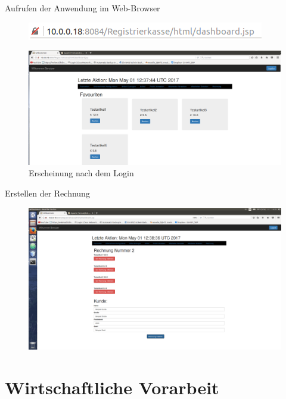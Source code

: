 \documentclass[12pt]{beamer}
\begin{document}
\begin{frame}
	Aufrufen der Anwendung im Web-Browser
	
	\begin{figure}
		\includegraphics[scale=0.7]{Bilder/url.png}
	\end{figure}
	\begin{figure}
		\includegraphics[scale=0.13]{Bilder/favouriten.png}
		\caption{Erscheinung nach dem Login}
	\end{figure}
\end{frame}

\begin{frame}
Erstellen der Rechnung
\begin{figure}
	\includegraphics[scale=0.2]{Bilder/rechnungErstellen.png}
\end{figure}
\end{frame}












\section{Wirtschaftliche Vorarbeit}
\end{document}
